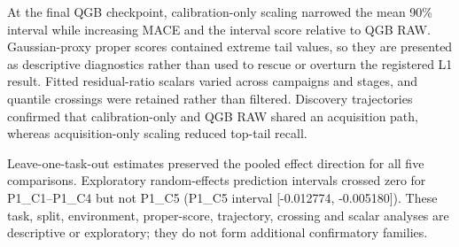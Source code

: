 \documentclass[10pt,twocolumn]{article}
\begin{document}
At the final QGB checkpoint, calibration-only scaling narrowed the mean 90\% interval while increasing MACE and the interval score relative to QGB RAW. Gaussian-proxy proper scores contained extreme tail values, so they are presented as descriptive diagnostics rather than used to rescue or overturn the registered L1 result. Fitted residual-ratio scalars varied across campaigns and stages, and quantile crossings were retained rather than filtered. Discovery trajectories confirmed that calibration-only and QGB RAW shared an acquisition path, whereas acquisition-only scaling reduced top-tail recall.

Leave-one-task-out estimates preserved the pooled effect direction for all five comparisons. Exploratory random-effects prediction intervals crossed zero for P1\_C1--P1\_C4 but not P1\_C5 (P1\_C5 interval [-0.012774, -0.005180]). These task, split, environment, proper-score, trajectory, crossing and scalar analyses are descriptive or exploratory; they do not form additional confirmatory families.
\end{document}
